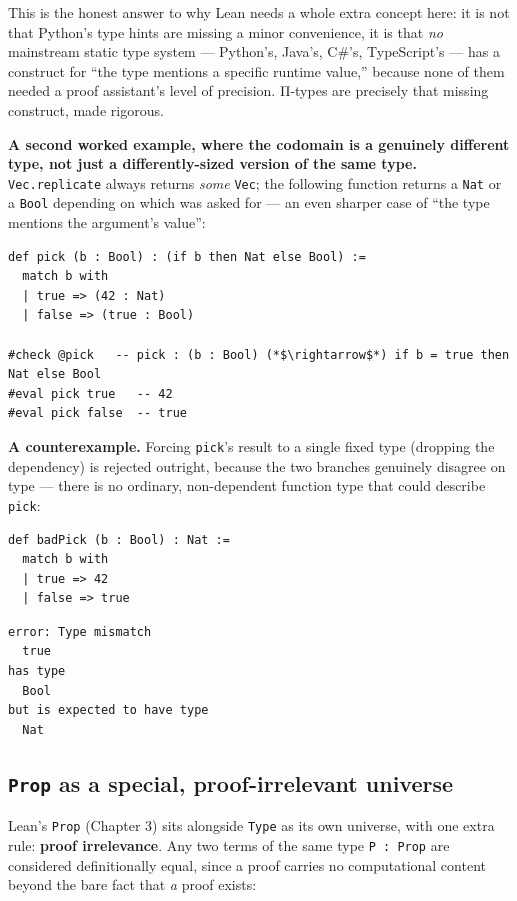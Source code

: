 This is the honest answer to why Lean needs a whole extra concept here: it is not that Python's type hints are missing a minor convenience, it is that \emph{no} mainstream static type system --- Python's, Java's, C\#'s, TypeScript's --- has a construct for ``the type mentions a specific runtime value,'' because none of them needed a proof assistant's level of precision. Π-types are precisely that missing construct, made rigorous.

\textbf{A second worked example, where the codomain is a genuinely different type, not just a differently-sized version of the same type.} \texttt{Vec.replicate} always returns \emph{some} \texttt{Vec}; the following function returns a \texttt{Nat} or a \texttt{Bool} depending on which was asked for --- an even sharper case of ``the type mentions the argument's value'':

\begin{lstlisting}
def pick (b : Bool) : (if b then Nat else Bool) :=
  match b with
  | true => (42 : Nat)
  | false => (true : Bool)

#check @pick   -- pick : (b : Bool) (*$\rightarrow$*) if b = true then Nat else Bool
#eval pick true   -- 42
#eval pick false  -- true
\end{lstlisting}

\textbf{A counterexample.} Forcing \texttt{pick}'s result to a single fixed type (dropping the dependency) is rejected outright, because the two branches genuinely disagree on type --- there is no ordinary, non-dependent function type that could describe \texttt{pick}:

\begin{lstlisting}
def badPick (b : Bool) : Nat :=
  match b with
  | true => 42
  | false => true
\end{lstlisting}

\begin{lstlisting}
error: Type mismatch
  true
has type
  Bool
but is expected to have type
  Nat
\end{lstlisting}

\subsection{\texorpdfstring{\texttt{Prop} as a special, proof-irrelevant universe}{Prop as a special, proof-irrelevant universe}}\label{sec:01-basics:05-pi-sigma-and-coc:4}

Lean's \texttt{Prop} (Chapter 3) sits alongside \texttt{Type} as its own universe, with one extra rule: \textbf{proof irrelevance}. Any two terms of the same type \texttt{P : Prop} are considered definitionally equal, since a proof carries no computational content beyond the bare fact that \emph{a} proof exists:

